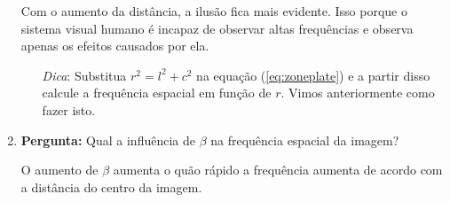 \documentclass[11pt]{article}
\begin{document}
\begin{enumerate}
Com o aumento da distância, a ilusão fica mais evidente. Isso porque o sistema visual humano é incapaz de observar altas frequências e observa apenas os efeitos causados por ela.

\begin{itemize}
\item[\textit{Dica}:] Substitua $r^2 = l^2 + c^2$ na equação (\ref{eq:zoneplate}) e a partir disso calcule a frequência espacial em função de $r$. Vimos anteriormente como fazer isto.
\end{itemize}

\item \textbf{Pergunta:} Qual a influência de $\beta$ na frequência espacial da imagem?

O aumento de $\beta$ aumenta o quão rápido a frequência aumenta de acordo com a distância do centro da imagem.

\end{enumerate}
\end{document}

